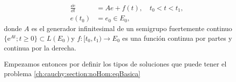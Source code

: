 \begin{equation}
    \label{ch:cauchy:section:noHom:eqBasica}
    \begin{aligned}
        \frac{\dd e}{\dd t} &= Ae + f(t), \quad t_0 < t < t_1,\\
        e(t_0) &= e_0 \in E_0,
    \end{aligned}
\end{equation}
donde $A$ es el generador infinitesimal de un semigrupo fuertemente continuo $\{\mathrm{e}^{At} ; t \geq 0\} \subset L(E_0)$\footnotemark y $f : [t_0, t_1) \rightarrow E_0$ es una función continua por partes y continua por la derecha.

Empezamos entonces por definir los tipos de soluciones que puede tener el problema \eqref{ch:cauchy:section:noHom:eqBasica}\\

